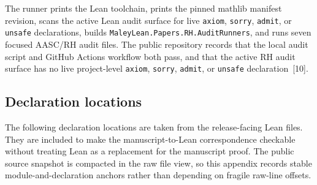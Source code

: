 \documentclass[11pt]{article}
\begin{document}
The runner prints the Lean toolchain, prints the pinned mathlib manifest revision, scans the active Lean audit surface for live \texttt{axiom}, \texttt{sorry}, \texttt{admit}, or \texttt{unsafe} declarations, builds \texttt{MaleyLean.Papers.RH.AuditRunners}, and runs seven focused AASC/RH audit files.  The public repository records that the local audit script and GitHub Actions workflow both pass, and that the active RH audit surface has no live project-level \texttt{axiom}, \texttt{sorry}, \texttt{admit}, or \texttt{unsafe} declaration~[10].

\subsection{Declaration locations}

The following declaration locations are taken from the release-facing Lean files.  They are included to make the manuscript-to-Lean correspondence checkable without treating Lean as a replacement for the manuscript proof.  The public source snapshot is compacted in the raw file view, so this appendix records stable module-and-declaration anchors rather than depending on fragile raw-line offsets.
\end{document}
